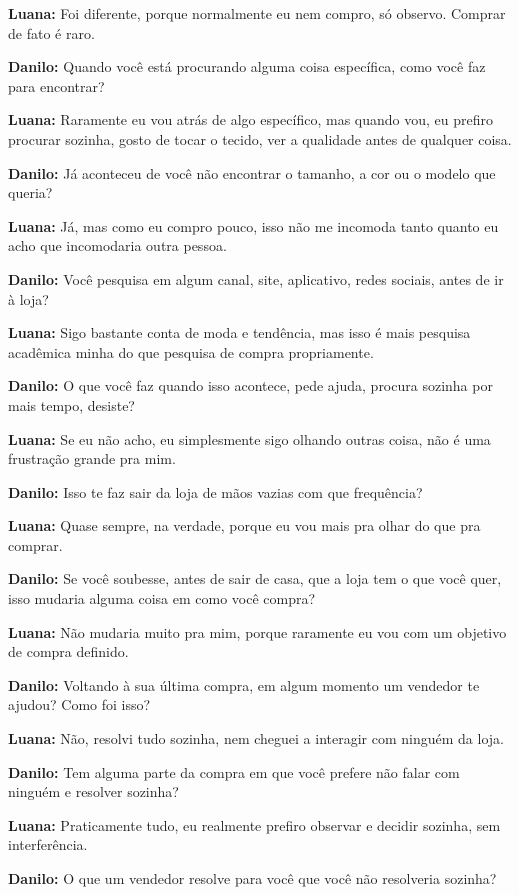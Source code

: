 \textbf{Luana:} Foi diferente, porque normalmente eu nem compro, só observo. Comprar de fato é raro.

\textbf{Danilo:} Quando você está procurando alguma coisa específica, como você faz para encontrar?

\textbf{Luana:} Raramente eu vou atrás de algo específico, mas quando vou, eu prefiro procurar sozinha, gosto de tocar o tecido, ver a qualidade antes de qualquer coisa.

\textbf{Danilo:} Já aconteceu de você não encontrar o tamanho, a cor ou o modelo que queria?

\textbf{Luana:} Já, mas como eu compro pouco, isso não me incomoda tanto quanto eu acho que incomodaria outra pessoa.

\textbf{Danilo:} Você pesquisa em algum canal, site, aplicativo, redes sociais, antes de ir à loja?

\textbf{Luana:} Sigo bastante conta de moda e tendência, mas isso é mais pesquisa acadêmica minha do que pesquisa de compra propriamente.

\textbf{Danilo:} O que você faz quando isso acontece, pede ajuda, procura sozinha por mais tempo, desiste?

\textbf{Luana:} Se eu não acho, eu simplesmente sigo olhando outras coisa, não é uma frustração grande pra mim.

\textbf{Danilo:} Isso te faz sair da loja de mãos vazias com que frequência?

\textbf{Luana:} Quase sempre, na verdade, porque eu vou mais pra olhar do que pra comprar.

\textbf{Danilo:} Se você soubesse, antes de sair de casa, que a loja tem o que você quer, isso mudaria alguma coisa em como você compra?

\textbf{Luana:} Não mudaria muito pra mim, porque raramente eu vou com um objetivo de compra definido.

\textbf{Danilo:} Voltando à sua última compra, em algum momento um vendedor te ajudou? Como foi isso?

\textbf{Luana:} Não, resolvi tudo sozinha, nem cheguei a interagir com ninguém da loja.

\textbf{Danilo:} Tem alguma parte da compra em que você prefere não falar com ninguém e resolver sozinha?

\textbf{Luana:} Praticamente tudo, eu realmente prefiro observar e decidir sozinha, sem interferência.

\textbf{Danilo:} O que um vendedor resolve para você que você não resolveria sozinha?

